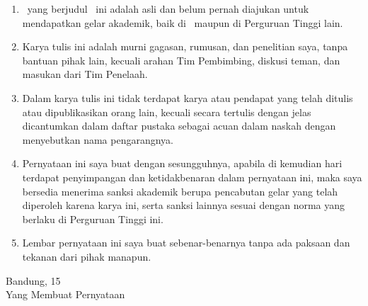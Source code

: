 \begin{enumerate}
    \item \jeniskaryatulis\ yang berjudul \judul\ ini adalah asli dan belum pernah diajukan untuk 
          mendapatkan gelar akademik, baik di \universitas\ maupun di Perguruan Tinggi lain.
    
    \item Karya tulis ini adalah murni gagasan, rumusan, dan penelitian saya, tanpa bantuan 
          pihak lain, kecuali arahan Tim Pembimbing, diskusi teman, dan masukan dari Tim Penelaah.
    
    \item Dalam karya tulis ini tidak terdapat karya atau pendapat yang telah ditulis atau 
          dipublikasikan orang lain, kecuali secara tertulis dengan jelas dicantumkan dalam 
          daftar pustaka sebagai acuan dalam naskah dengan menyebutkan nama pengarangnya.
    
    \item Pernyataan ini saya buat dengan sesungguhnya, apabila di kemudian hari terdapat 
          penyimpangan dan ketidakbenaran dalam pernyataan ini, maka saya bersedia menerima 
          sanksi akademik berupa pencabutan gelar yang telah diperoleh karena karya ini, 
          serta sanksi lainnya sesuai dengan norma yang berlaku di Perguruan Tinggi ini.
    
    \item Lembar pernyataan ini saya buat sebenar-benarnya tanpa ada paksaan dan tekanan 
          dari pihak manapun.
\end{enumerate}

\begin{flushright}
    \begin{minipage}{5cm}
        \centering
        Bandung, 15 \bulan\\
        Yang Membuat Pernyataan\\
        \vspace{2cm}
        \textbf{\underline{\penulis}}\\
        \nimpenulis
    \end{minipage}
\end{flushright}


